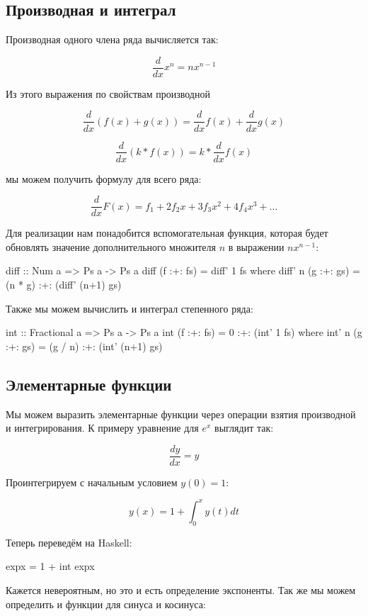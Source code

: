 \subsection{Производная и интеграл}

Производная одного члена ряда вычисляется так:

\[  \frac{d}{dx} x^n = n x^{n-1} \]

Из этого выражения по свойствам производной 

\[   \frac{d}{dx}(f(x) + g(x)) =  \frac{d}{dx}f(x) +  \frac{d}{dx}g(x) \]

\[  \frac{d}{dx} (k * f(x)) = k *  \frac{d}{dx} f(x)\]

мы можем получить формулу для всего ряда:

\[   \frac{d}{dx} F(x) = f_1 + 2 f_2 x + 3 f_3 x^2 + 4 f_4 x^3 + \dots \]

Для реализации нам понадобится вспомогательная функция, которая
будет обновлять значение дополнительного множителя $n$ в выражении
$n x^{n-1}$:


\begin{code}
diff :: Num a => Ps a -> Ps a
diff (f :+: fs) = diff' 1 fs
    where diff' n (g :+: gs) = (n * g) :+: (diff' (n+1) gs)
\end{code}


Также мы можем вычислить и интеграл степенного ряда:


\begin{code}
int :: Fractional a => Ps a -> Ps a
int (f :+: fs) = 0 :+: (int' 1 fs) 
    where int' n (g :+: gs) = (g / n) :+: (int' (n+1) gs)
\end{code}


\subsection{Элементарные функции}

Мы можем выразить элементарные функции через 
операции взятия производной и интегрирования.
К примеру уравнение для $e^x$ выглядит так:

\[ \frac{dy}{dx} = y \]

Проинтегрируем с начальным условием $y(0) = 1$:

\[ y(x) = 1 + \int_0^x y(t) dt  \]

Теперь переведём на Haskell:


\begin{code}
expx = 1 + int expx
\end{code}


Кажется невероятным, но это и есть определение экспоненты.
Так же мы можем определить и функции для синуса и косинуса:

